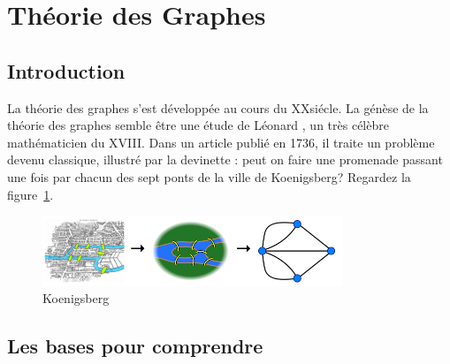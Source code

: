 \section{Théorie des Graphes}
\subsection{Introduction}
La théorie des graphes s'est développée au cours du \textsc{XX}\ieme siécle.
La génèse de la théorie des graphes semble être une étude de Léonard
, un très célèbre mathématicien du \textsc{XVIII}\ieme.
Dans un article publié en 1736, il traite un problème devenu classique,
illustré par la devinette : peut on faire une promenade passant une fois par
chacun des sept ponts de la ville de Koenigsberg?
Regardez la figure~\ref{fig.koenig}.
\begin{figure}
\centering
\includegraphics[width=0.8\textwidth]{koenigsberg}
\caption{Koenigsberg}\label{fig.koenig}
\end{figure}
\subsection{Les bases pour comprendre \algo}

